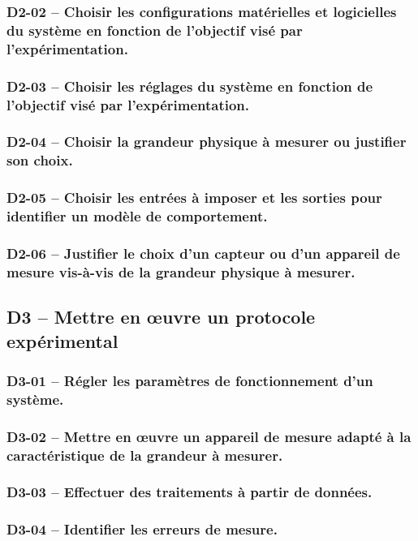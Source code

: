 \subsubsection*{D2-02 -- Choisir les configurations matérielles et logicielles du système en fonction de l'objectif visé par l'expérimentation.}  
\subsubsection*{D2-03 -- Choisir les réglages du système en fonction de l'objectif visé par l'expérimentation.}  
\subsubsection*{D2-04 -- Choisir la grandeur physique à mesurer ou justifier son choix.}  
\subsubsection*{D2-05 -- Choisir les entrées à imposer et les sorties pour identifier un modèle de comportement.}  
\subsubsection*{D2-06 -- Justifier le choix d’un capteur ou d’un appareil de mesure vis-à-vis de la grandeur physique à mesurer.}  
\subsection{D3 -- Mettre en œuvre un protocole expérimental}  
\subsubsection*{D3-01 -- Régler les paramètres de fonctionnement d'un système.}  
\subsubsection*{D3-02 -- Mettre en œuvre un appareil de mesure adapté à la caractéristique de la grandeur à mesurer.}  
\subsubsection*{D3-03 -- Effectuer des traitements à partir de données. }  
\subsubsection*{D3-04 -- Identifier les erreurs de mesure.}  
